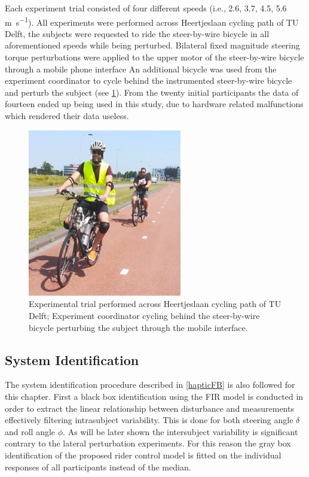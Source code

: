 Each experiment trial consisted of four different speeds (i.e., 2.6, 3.7, 4.5, 5.6 \si{\meter\per s}). All experiments were performed across Heertjeslaan cycling path of TU Delft, the subjects were requested to ride the steer-by-wire bicycle in all aforementioned speeds while being  perturbed. Bilateral fixed magnitude steering torque  perturbations were applied to the upper motor of the steer-by-wire bicycle through a mobile phone interface  An additional bicycle was used from the experiment coordinator to cycle behind  the instrumented steer-by-wire bicycle and perturb the subject (see \cref{steerexperiment}). From the twenty initial participants the data of fourteen ended up being used in this study, due to hardware related malfunctions which rendered their data useless.
\begin{figure}[!h]
    \centering
    \includegraphics [width=0.6\textwidth]{images/steer_irf/steer_exp.png}
    \caption{Experimental trial performed across Heertjeslaan cycling path of TU Delft; Experiment coordinator cycling behind the steer-by-wire bicycle perturbing the subject through the mobile interface.}
    \label{steerexperiment}
    \end{figure}
\subsection{System Identification} 
The system identification procedure described in \cref{hapticFB} is also followed for this chapter. First a black box identification using the FIR model is conducted in order to  extract the linear relationship between disturbance and measurements effectively filtering intrasubject variability. This is done for both steering angle \ensuremath{\delta} and roll angle \ensuremath{\phi}. As will be later shown the intersubject variability is significant contrary to the lateral perturbation experiments. For this reason the gray box identification of the proposed rider control model is fitted on the individual responses of all participants instead of the median.
